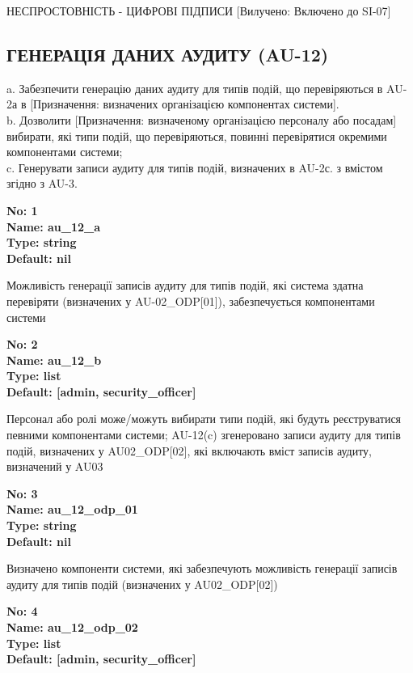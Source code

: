 \documentclass{article}
\begin{document}
{\footnotesize НЕСПРОСТОВНІСТЬ - ЦИФРОВІ ПІДПИСИ [Вилучено: Включено до SI-07]}




\subsection{ГЕНЕРАЦІЯ ДАНИХ АУДИТУ (AU-12)}
a. Забезпечити генерацію даних аудиту для типів подій, що перевіряються в AU-2а в [Призначення: визначених організацією компонентах системи].\\ 
b. Дозволити [Призначення: визначеному організацією персоналу або посадам] вибирати, які типи подій, що перевіряються, повинні перевірятися окремими компонентами системи;\\ 
c. Генерувати записи аудиту для типів подій, визначених в AU-2с. з вмістом згідно з AU-3.

\vspace{10pt}
{\footnotesize\bfseries
No: 1\\
Name: au\_\allowbreak{}12\_\allowbreak{}a\\
Type: string\\
Default: nil
}

{\footnotesize Можливість генерації записів аудиту для типів подій, які система здатна перевіряти (визначених у AU-02\_\allowbreak{}ODP[01]), забезпечується компонентами системи}


{\footnotesize\bfseries
No: 2\\
Name: au\_\allowbreak{}12\_\allowbreak{}b\\
Type: list\\
Default: [\textquotedbl{}admin\textquotedbl{}, \textquotedbl{}security\_\allowbreak{}officer\textquotedbl{}]
}

{\footnotesize Персонал або ролі може/можуть вибирати типи подій, які будуть реєструватися певними компонентами системи; AU-12(c) згенеровано записи аудиту для типів подій, визначених у AU02\_\allowbreak{}ODP[02], які включають вміст записів аудиту, визначений у AU03}


{\footnotesize\bfseries
No: 3\\
Name: au\_\allowbreak{}12\_\allowbreak{}odp\_\allowbreak{}01\\
Type: string\\
Default: nil
}

{\footnotesize Визначено компоненти системи, які забезпечують можливість генерації записів аудиту для типів подій (визначених у AU02\_\allowbreak{}ODP[02])}


{\footnotesize\bfseries
No: 4\\
Name: au\_\allowbreak{}12\_\allowbreak{}odp\_\allowbreak{}02\\
Type: list\\
Default: [\textquotedbl{}admin\textquotedbl{}, \textquotedbl{}security\_\allowbreak{}officer\textquotedbl{}]
}
\end{document}
